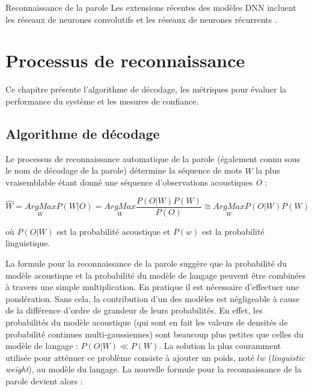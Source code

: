 \documentclass{style/these}
\let\oldcite=\cite
\renewcommand{\cite}[1]{{\fontfamily{qcs}\selectfont{\color{darkerblue}[\oldcite{#1}]}}}
\begin{document}
\begin{part}{Reconnaissance de la parole}
Les extensions récentes des modèles DNN incluent les réseaux de neurones convolutifs \cite{Hamid:2012} et les réseaux de neurones récurrents \cite{Sak:2014}.





\chapter{Processus de reconnaissance}
\renewcommand{\leftmark}{Processus de reconnaissance}
\renewcommand{\rightmark}{}

Ce chapitre présente l'algorithme de décodage, les métriques pour évaluer la performance du système et les mesures de confiance.

\minitoc

\section{Algorithme de décodage}
\renewcommand{\rightmark}{Algorithme de décodage}

Le processus de reconnaissance automatique de la parole (également connu sous le nom de décodage de la parole) détermine la séquence de mots $\hat{W}$ la plus vraisemblable étant donné une séquence d'observations acoustiques \textit{O} :

\begin{equation*} 
	\hat{W}=\underset{W}{ArgMax} P(W|O)= \underset{W}{ArgMax} \frac{P(O|W)P(W)}{P(O)} \cong \underset{W}{ArgMax} P(O|W)P(W)
\label{Eq:Dec}
\end{equation*} 

\noindent où $P(O|W)$ est la probabilité acoustique et  $P(w)$  est la probabilité linguistique.

La formule pour la reconnaissance de la parole suggère que la probabilité du modèle acoustique et la probabilité du modèle de langage peuvent être combinées à travers une simple multiplication. 
En pratique il est nécessaire d'effectuer une pondération. 
Sans cela, la contribution d'un des modèles est négligeable à cause de la différence d'ordre de grandeur de leurs probabilités. 
En effet, les probabilités du modèle acoustique (qui sont en fait les valeurs de densités de probabilité continues multi-gaussiennes) sont beaucoup plus petites que celles du modèle de langage : $P(O|W) \ll P(W)$. 
La solution la plus couramment utilisée pour atténuer ce problème consiste à ajouter un poids, noté $lw$ (\textit{linguistic weight}), au modèle du langage. La nouvelle formule pour la reconnaissance de la parole devient alors :


\end{part}
\end{document}
